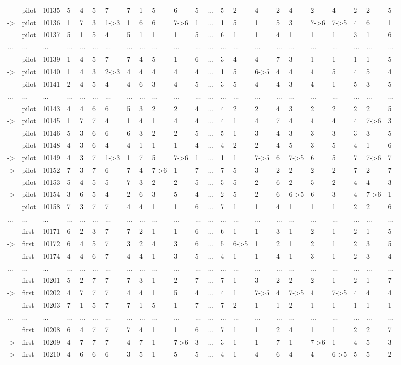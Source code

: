 \begin{landscape}
{\begin{longtable}{lllllllllllllllllllllll}
&pilot&10135&5&4&5&7&7&1&5&6&5&...&5&2&4&2&4&2&4&2&2&5\tabularnewline
-\textgreater &pilot&10136&1&7&3&1-\textgreater 3&1&6&6&7-\textgreater 6&1&...&1&5&1&5&3&7-\textgreater 6&7-\textgreater 5&4&6&1\tabularnewline
&pilot&10137&5&1&5&4&5&1&1&1&5&...&6&1&1&4&1&1&1&3&1&6\tabularnewline
...&...&...&...&...&...&...&...&...&...&...&...&...&...&...&...&...&...&...&...&...&...&...\tabularnewline
&pilot&10139&1&4&5&7&7&4&5&1&6&...&3&4&4&7&3&1&1&1&1&5\tabularnewline
-\textgreater &pilot&10140&1&4&3&2-\textgreater 3&4&4&4&4&4&...&1&5&6-\textgreater 5&4&4&4&5&4&5&4\tabularnewline
&pilot&10141&2&4&5&4&4&6&3&4&5&...&3&5&4&4&3&4&1&5&3&5\tabularnewline
...&...&...&...&...&...&...&...&...&...&...&...&...&...&...&...&...&...&...&...&...&...&...\tabularnewline
&pilot&10143&4&4&6&6&5&3&2&2&4&...&4&2&2&4&3&2&2&2&2&5\tabularnewline
-\textgreater &pilot&10145&1&7&7&4&1&4&1&4&4&...&4&1&4&7&4&4&4&4&7-\textgreater 6&3\tabularnewline
&pilot&10146&5&3&6&6&6&3&2&2&5&...&5&1&3&4&3&3&3&3&3&5\tabularnewline
&pilot&10148&4&3&6&4&4&1&1&1&4&...&4&2&2&4&5&3&5&4&1&6\tabularnewline
-\textgreater &pilot&10149&4&3&7&1-\textgreater 3&1&7&5&7-\textgreater 6&1&...&1&1&7-\textgreater 5&6&7-\textgreater 5&6&5&7&7-\textgreater 6&7\tabularnewline
-\textgreater &pilot&10152&7&3&7&6&7&4&7-\textgreater 6&1&7&...&7&5&3&2&2&2&2&7&2&7\tabularnewline
&pilot&10153&5&4&5&5&7&3&2&2&5&...&5&5&2&6&2&5&2&4&4&3\tabularnewline
-\textgreater &pilot&10154&3&6&5&4&2&6&3&5&4&...&2&5&2&6&6-\textgreater 5&6&3&4&7-\textgreater 6&1\tabularnewline
&pilot&10158&7&3&7&7&4&4&1&1&6&...&7&1&1&4&1&1&1&2&2&6\tabularnewline
...&...&...&...&...&...&...&...&...&...&...&...&...&...&...&...&...&...&...&...&...&...&...\tabularnewline
&first&10171&6&2&3&7&7&2&1&1&6&...&6&1&1&3&1&2&1&2&1&5\tabularnewline
-\textgreater &first&10172&6&4&5&7&3&2&4&3&6&...&5&6-\textgreater 5&1&2&1&2&1&2&3&5\tabularnewline
&first&10174&4&4&6&7&4&4&1&3&5&...&4&1&1&4&1&3&1&2&3&4\tabularnewline
...&...&...&...&...&...&...&...&...&...&...&...&...&...&...&...&...&...&...&...&...&...&...\tabularnewline
&first&10201&5&2&7&7&7&3&1&2&7&...&7&1&3&2&2&2&1&2&1&7\tabularnewline
-\textgreater &first&10202&4&7&7&7&4&4&1&5&4&...&4&1&7-\textgreater 5&4&7-\textgreater 5&4&7-\textgreater 5&4&4&4\tabularnewline
&first&10203&7&1&5&7&7&1&5&1&7&...&7&2&1&1&2&1&1&1&1&1\tabularnewline
...&...&...&...&...&...&...&...&...&...&...&...&...&...&...&...&...&...&...&...&...&...&...\tabularnewline
&first&10208&6&4&7&7&7&4&1&1&6&...&7&1&1&2&4&1&1&2&2&7\tabularnewline
-\textgreater &first&10209&4&7&7&7&4&7&1&7-\textgreater 6&3&...&3&1&1&7&1&7-\textgreater 6&1&4&5&3\tabularnewline
-\textgreater &first&10210&4&6&6&6&3&5&1&5&5&...&4&1&4&6&4&4&6-\textgreater 5&5&5&2\tabularnewline

\end{longtable}}
\end{landscape}

